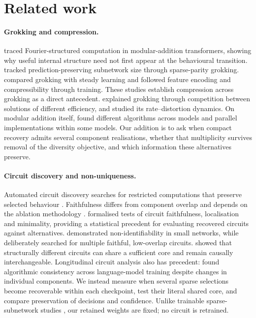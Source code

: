 \section{Related work}

\paragraph{Grokking and compression.}
\citet{nanda2023progress} traced Fourier-structured computation in modular-addition transformers, showing why useful internal structure need not first appear at the behavioural transition. \citet{merrill2023two} tracked prediction-preserving subnetwork size through sparse-parity grokking. \citet{manningcoe2026grokking} compared grokking with steady learning and followed feature encoding and compressibility through training. These studies establish compression across grokking as a direct antecedent. \citet{varma2023efficiency} explained grokking through competition between solutions of different efficiency, and \citet{demoss2025complexity} studied its rate--distortion dynamics. On modular addition itself, \citet{zhong2023clock} found different algorithms across models and parallel implementations within some models. Our addition is to ask when compact recovery admits several component realisations, whether that multiplicity survives removal of the diversity objective, and which information these alternatives preserve.

\paragraph{Circuit discovery and non-uniqueness.}
Automated circuit discovery searches for restricted computations that preserve selected behaviour \citep{conmy2023automated,bhaskar2024finding}. Faithfulness differs from component overlap \citep{hanna2024faith} and depends on the ablation methodology \citep{miller2024robust}. \citet{shi2024hypothesis} formalised tests of circuit faithfulness, localisation and minimality, providing a statistical precedent for evaluating recovered circuits against alternatives. \citet{meloux2025everything} demonstrated non-identifiability in small networks, while \citet{chen2026rome} deliberately searched for multiple faithful, low-overlap circuits. \citet{bayatmakou2026many} showed that structurally different circuits can share a sufficient core and remain causally interchangeable. Longitudinal circuit analysis also has precedent: \citet{tigges2024consistent} found algorithmic consistency across language-model training despite changes in individual components. We instead measure when several sparse selections become recoverable within each checkpoint, test their literal shared core, and compare preservation of decisions and confidence. Unlike trainable sparse-subnetwork studies \citep{frankle2019lottery}, our retained weights are fixed; no circuit is retrained.


